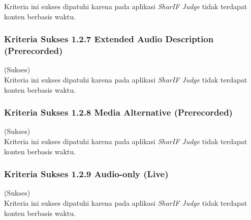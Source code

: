\documentclass[a4paper,twoside]{article}
\begin{document}
\begin{enumerate}
		Kriteria ini sukses dipatuhi karena pada aplikasi \textit{SharIF Judge} tidak terdapat konten berbasis waktu.
		
		\subsubsection*{Kriteria Sukses 1.2.7 Extended Audio Description (Prerecorded)}
		\label{subsubsec:kepatuhan_kriteria_1.2.7}
		(Sukses) \\
		
		Kriteria ini sukses dipatuhi karena pada aplikasi \textit{SharIF Judge} tidak terdapat konten berbasis waktu.
		
		\subsubsection*{Kriteria Sukses 1.2.8 Media Alternative (Prerecorded)}
		\label{subsubsec:kepatuhan_kriteria_1.2.8}
		(Sukses) \\
		
		Kriteria ini sukses dipatuhi karena pada aplikasi \textit{SharIF Judge} tidak terdapat konten berbasis waktu.
		
		\subsubsection*{Kriteria Sukses 1.2.9 Audio-only (Live)}
		\label{subsubsec:kepatuhan_kriteria_1.2.9}
		(Sukses) \\
		
		Kriteria ini sukses dipatuhi karena pada aplikasi \textit{SharIF Judge} tidak terdapat konten berbasis waktu.
		

\end{enumerate}
\end{document}
